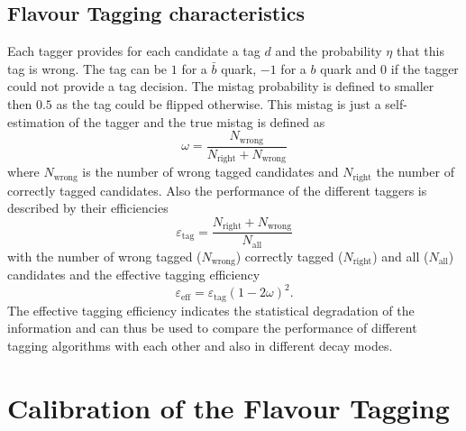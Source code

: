 \documentclass{PoS}
\begin{document}
\subsection{Flavour Tagging characteristics}

Each tagger provides for each candidate a tag $d$ and the probability $\eta$ that this tag is wrong. The tag can be $1$ for a $\bar{b}$ quark, $-1$ for a $b$ quark and $0$ if the tagger could not provide a tag decision. The mistag probability is defined to smaller then $0.5$ as the tag could be flipped otherwise. This mistag is just a self-estimation of the tagger and the true mistag is defined as
\begin{equation}
\omega=\frac{N_\text{wrong}}{N_\text{right}+N_\text{wrong}}
\end{equation}
where $N_\text{wrong}$ is the number of wrong tagged candidates and $N_\text{right}$ the number of correctly tagged candidates. Also the performance of the different taggers is described by their efficiencies
\begin{equation}
\varepsilon_\text{tag}=\frac{N_\text{right}+N_\text{wrong}}{N_\text{all}}
\end{equation}
with the number of wrong tagged ($N_\text{wrong}$) correctly tagged ($N_\text{right}$) and all ($N_\text{all}$) candidates and the effective tagging efficiency 
\begin{equation}
\varepsilon_\text{eff}=\varepsilon_\text{tag}\left(1-2\omega\right)^2.
\end{equation}
The effective tagging efficiency indicates the statistical degradation of the information and can thus be used to compare the performance of different tagging algorithms with each other and also in different decay modes.

\section{Calibration of the Flavour Tagging}\label{sec:3}
\end{document}
